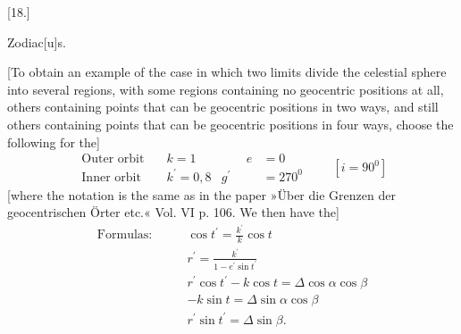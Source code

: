 \begin{center}
[18.]

Zodiac[u]s.
\end{center}

[To obtain an example of the case in which two limits divide the celestial sphere into several regions, with some regions containing no geocentric positions at all, others containing points that can be geocentric positions in two ways, and still others containing points that can be geocentric positions in four ways, choose the following for the]
\[
\begin{aligned}
\text{Outer orbit}\quad &k=1&\qquad e&=0\\
\text{Inner orbit}\quad &k^{\prime}=0{,}8&g^{\prime}&=270^{0}
\end{aligned}
\qquad [i=90^{0}]
\]
[where the notation is the same as in the paper »Über die Grenzen der geocentrischen Örter etc.« Vol. VI p. 106. We then have the]
\[
\begin{aligned}
\text{Formulas:}\qquad &\cos t^{\prime}=\frac{k^{\prime}}{k}\cos t\\[5pt]
&r^{\prime}=\frac{k^{\prime}}{1-e^{\prime}\sin t^{\prime}}\\[5pt]
&r^{\prime}\cos t^{\prime}-k\cos t=\Delta\cos\alpha\cos\beta\\[5pt]
&-k\sin t=\Delta\sin\alpha\cos\beta\\[5pt]
&r^{\prime}\sin t^{\prime}=\Delta\sin\beta.
\end{aligned}
\]

